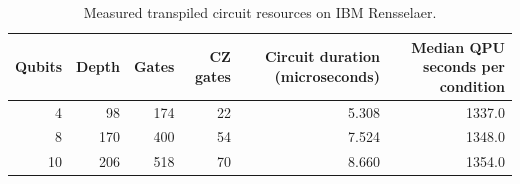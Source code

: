 \begin{table}[tbp]
\caption{Measured transpiled circuit resources on IBM Rensselaer.}
\label{tab:circuit-resources}
\begin{tabular}{rrrrrr}
\toprule
Qubits & Depth & Gates & CZ gates & Circuit duration (microseconds) & Median QPU seconds per condition \\
\midrule
4 & 98 & 174 & 22 & 5.308 & 1337.0 \\
8 & 170 & 400 & 54 & 7.524 & 1348.0 \\
10 & 206 & 518 & 70 & 8.660 & 1354.0 \\
\bottomrule
\end{tabular}
\end{table}
